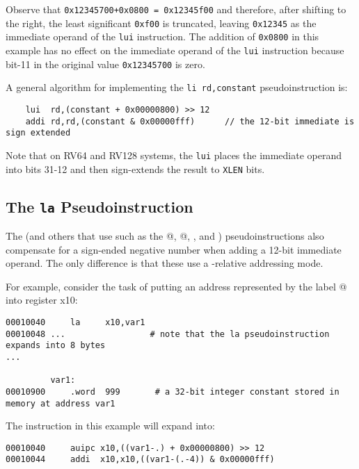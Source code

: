Observe that {\tt 0x12345700+0x0800 = 0x12345f00} and therefore, after shifting
to the right, the least significant {\tt 0xf00} is truncated, leaving {\tt 0x12345} as 
the immediate operand of the {\tt lui} instruction.  The addition of 
{\tt 0x0800} in this example has no effect on the immediate operand of the {\tt lui}
instruction because bit-11 in the original value {\tt 0x12345700} is zero.

A general algorithm for implementing the {\tt li rd,constant} pseudoinstruction is:

{\small
\begin{verbatim}
    lui  rd,(constant + 0x00000800) >> 12     
    addi rd,rd,(constant & 0x00000fff)		// the 12-bit immediate is sign extended 
\end{verbatim}
}

%
Note that on RV64 and RV128 systems, the {\tt lui} places the immediate operand into
bits 31-12 and then sign-extends the result to {\tt XLEN} bits.









\subsection{The {\tt la} Pseudoinstruction}

The \verb@la@ (and others that use \verb@auipc@ such as 
the @, @, \verb@call@, and \verb@tail@) pseudoinstructions
also compensate for a sign-ended negative number when adding a 12-bit immediate
operand. The only difference is that these use a \verb@pc@-relative addressing mode.

For example, consider the task of putting an address represented by the label @
into register x10:

{\small
\begin{verbatim}
00010040     la     x10,var1
00010048 ...                 # note that the la pseudoinstruction expands into 8 bytes
...

         var1:
00010900     .word  999       # a 32-bit integer constant stored in memory at address var1
\end{verbatim}
}
The \verb@la@ instruction in this example will expand into:
{\small
\begin{verbatim}
00010040     auipc x10,((var1-.) + 0x00000800) >> 12
00010044     addi  x10,x10,((var1-(.-4)) & 0x00000fff)
\end{verbatim}
}


